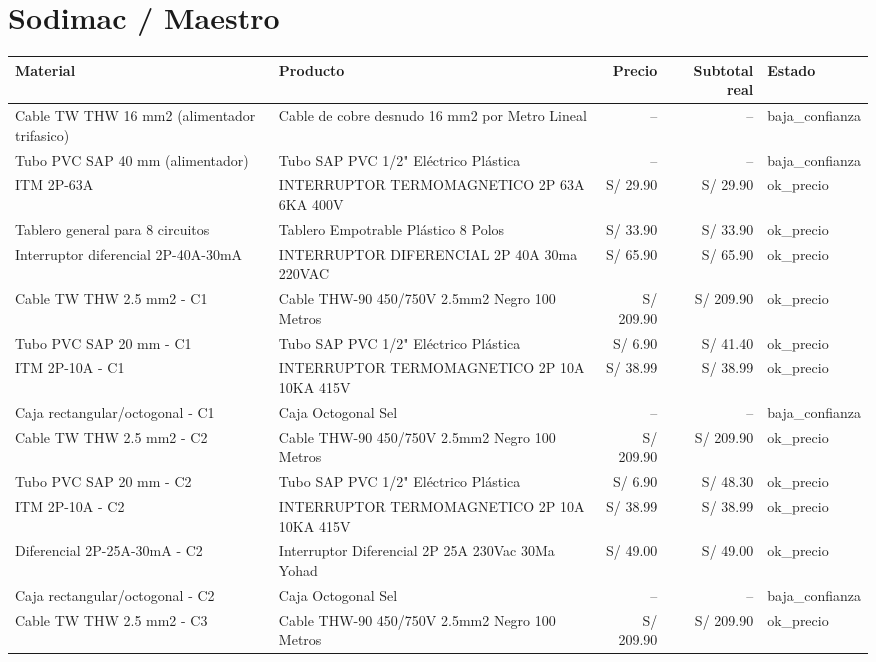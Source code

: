 \documentclass[11pt,a4paper]{article}
\begin{document}
\section{Sodimac / Maestro}
\begin{longtable}{p{} p{} r r p{}}
\toprule Material & Producto & Precio & Subtotal real & Estado \\ \midrule\endhead
Cable TW THW 16 mm2 (alimentador trifasico) & Cable de cobre desnudo 16 mm2 por Metro Lineal & -- & -- & baja\_confianza \\
Tubo PVC SAP 40 mm (alimentador) & Tubo SAP PVC 1/2" Eléctrico Plástica & -- & -- & baja\_confianza \\
ITM 2P-63A & INTERRUPTOR TERMOMAGNETICO 2P 63A 6KA 400V & S/ 29.90 & S/ 29.90 & ok\_precio \\
Tablero general para 8 circuitos & Tablero Empotrable Plástico 8 Polos & S/ 33.90 & S/ 33.90 & ok\_precio \\
Interruptor diferencial 2P-40A-30mA & INTERRUPTOR DIFERENCIAL 2P 40A 30ma 220VAC & S/ 65.90 & S/ 65.90 & ok\_precio \\
Cable TW THW 2.5 mm2 - C1 & Cable THW-90 450/750V 2.5mm2 Negro 100 Metros & S/ 209.90 & S/ 209.90 & ok\_precio \\
Tubo PVC SAP 20 mm - C1 & Tubo SAP PVC 1/2" Eléctrico Plástica & S/ 6.90 & S/ 41.40 & ok\_precio \\
ITM 2P-10A - C1 & INTERRUPTOR TERMOMAGNETICO 2P 10A 10KA 415V & S/ 38.99 & S/ 38.99 & ok\_precio \\
Caja rectangular/octogonal - C1 & Caja Octogonal Sel & -- & -- & baja\_confianza \\
Cable TW THW 2.5 mm2 - C2 & Cable THW-90 450/750V 2.5mm2 Negro 100 Metros & S/ 209.90 & S/ 209.90 & ok\_precio \\
Tubo PVC SAP 20 mm - C2 & Tubo SAP PVC 1/2" Eléctrico Plástica & S/ 6.90 & S/ 48.30 & ok\_precio \\
ITM 2P-10A - C2 & INTERRUPTOR TERMOMAGNETICO 2P 10A 10KA 415V & S/ 38.99 & S/ 38.99 & ok\_precio \\
Diferencial 2P-25A-30mA - C2 & Interruptor Diferencial 2P 25A 230Vac 30Ma Yohad & S/ 49.00 & S/ 49.00 & ok\_precio \\
Caja rectangular/octogonal - C2 & Caja Octogonal Sel & -- & -- & baja\_confianza \\
Cable TW THW 2.5 mm2 - C3 & Cable THW-90 450/750V 2.5mm2 Negro 100 Metros & S/ 209.90 & S/ 209.90 & ok\_precio \\

\end{longtable}
\end{document}
